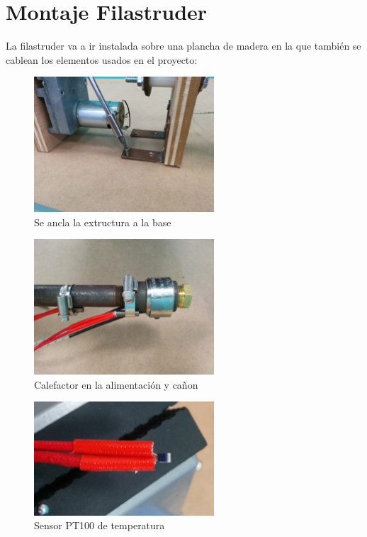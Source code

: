 \chapter{Montaje Filastruder}
\label{ane:filastruder}

La filastruder va a ir instalada sobre una plancha de madera en la que también se cablean los elementos usados en el proyecto:

   	\begin{figure}[H]
            \centering
            \includegraphics[width=0.6\textwidth]{images/filaextruder/IMG_20150313_114401.jpg}
            \caption{Se ancla la extructura a la base}
            \label{fig:fila_montaje1}
    \end{figure}
    \begin{figure}[H]
            \centering
            \includegraphics[width=0.6\textwidth]{images/filaextruder/IMG_20150324_175818.jpg}
            \caption{Calefactor en la alimentación y cañon}
            \label{fig:fila_montaje2}
    \end{figure}
    \begin{figure}[H]
            \centering
            \includegraphics[width=0.6\textwidth]{images/filaextruder/IMG_20150325_145634.jpg}
            \caption{Sensor PT100 de temperatura}
            \label{fig:fila_montaje3}
    \end{figure}

